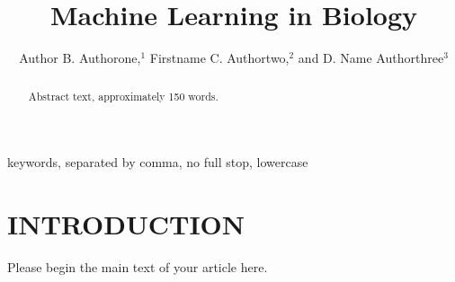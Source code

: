 \documentclass{ar-1col-S2O}
\begin{document}

\title{Machine Learning in Biology}


\author{Author B. Authorone,$^1$ Firstname C. Authortwo,$^2$ and D. Name Authorthree$^3$
}

\begin{abstract}
Abstract text, approximately 150 words. 
\end{abstract}

\begin{keywords}
keywords, separated by comma, no full stop, lowercase
\end{keywords}
\maketitle

\tableofcontents


\section{INTRODUCTION}
Please begin the main text of your article here. 
\end{document}
